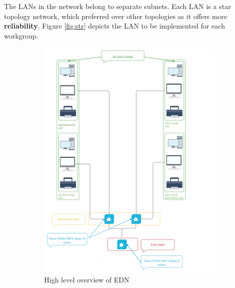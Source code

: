 \documentclass[ a4, 12pt, onecolumn]{IEEEtran}
\begin{document}
The LANs in the network belong to separate subnets. Each LAN is a star topology network, which preferred over other topologies as it offers more \textbf{reliability}. Figure \ref{fig:str} depicts the LAN to be implemented for each workgroup.
\begin{figure}[H]
  \begin{subfigure}[b]{0.5\textwidth}
    \includegraphics[width=\textwidth]{hnet.png}
    \caption{High level overview of EDN}
\label{fig:heirarch}
  \end{subfigure}
  \hfill
  \begin{subfigure}[b]{0.5\textwidth}

\end{subfigure}
\end{figure}
\end{document}
